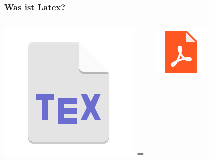 \documentclass{beamer}
\begin{document}
\begin{frame}
     \frametitle{Was ist Latex?}
     \begin{columns}[c] %
          
     \includegraphics[width=\textwidth]{pictures/texicon.png}
     \Huge{$ \Rightarrow $}
          
     \includegraphics[width=\textwidth]{pictures/pdficon.png}
          

\end{columns}
\end{frame}
\end{document}
